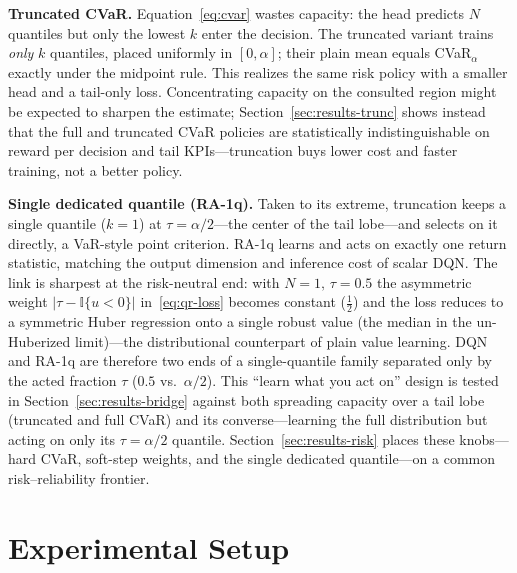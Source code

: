 \documentclass[conference]{IEEEtran}
\begin{document}
\textbf{Truncated CVaR.} Equation~\eqref{eq:cvar} wastes capacity: the head
predicts $N$ quantiles but only the lowest $k$ enter the decision. The truncated
variant trains \emph{only} $k$ quantiles, placed uniformly
in $[0,\alpha]$; their plain mean equals CVaR$_\alpha$ exactly under the midpoint
rule. This realizes the same risk policy with a smaller head and a tail-only
loss. Concentrating capacity on the consulted region might be expected to sharpen
the estimate; Section~\ref{sec:results-trunc} shows instead that the full and
truncated CVaR policies are statistically indistinguishable on reward per decision
and tail KPIs---truncation buys lower cost and faster training, not a better
policy.

\textbf{Single dedicated quantile (RA-1q).} Taken to its extreme, truncation
keeps a single quantile ($k{=}1$) at $\tau=\alpha/2$---the center of the tail
lobe---and selects on it directly, a VaR-style point criterion. RA-1q learns and
acts on exactly one return statistic, matching the output dimension and inference
cost of scalar DQN. The link is sharpest at the risk-neutral end: with
$N{=}1,\,\tau{=}0.5$ the asymmetric weight $|\tau-\mathbb{I}\{u<0\}|$
in~\eqref{eq:qr-loss} becomes constant ($\tfrac12$) and the loss reduces to a
symmetric Huber regression onto a single robust value (the median in the
un-Huberized limit)---the distributional counterpart of plain value learning. DQN
and RA-1q are therefore two ends of a single-quantile family separated only by the
acted fraction $\tau$ ($0.5$ vs.\ $\alpha/2$). This ``learn what you act on''
design is tested in Section~\ref{sec:results-bridge} against both spreading
capacity over a tail lobe (truncated and full CVaR) and its converse---learning
the full distribution but acting on only its $\tau{=}\alpha/2$ quantile.
Section~\ref{sec:results-risk} places these knobs---hard CVaR, soft-step weights,
and the single dedicated quantile---on a common risk--reliability frontier.


\section{Experimental Setup}
\label{sec:setup}
\end{document}
